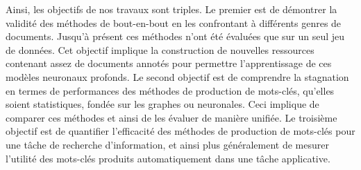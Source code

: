
Ainsi, les objectifs de nos travaux sont triples.
Le premier est de démontrer la validité des méthodes de bout-en-bout en les confrontant à différents genres de documents.
Jusqu'à présent ces méthodes n'ont été évaluées que sur un seul jeu de données.
Cet objectif implique la construction de nouvelles ressources contenant assez de documents annotés pour permettre l'apprentissage de ces modèles neuronaux profonds.
%
Le second objectif est de comprendre la stagnation en termes de performances des méthodes de production de mots-clés, qu'elles soient statistiques, fondée sur les graphes ou neuronales. Ceci implique de comparer ces méthodes et ainsi de les évaluer de manière unifiée.
%
Le troisième objectif est de quantifier l'efficacité des méthodes de production de mots-clés pour une tâche de recherche d'information, et ainsi plus généralement de mesurer l'utilité des mots-clés produits automatiquement dans une tâche applicative.\\

